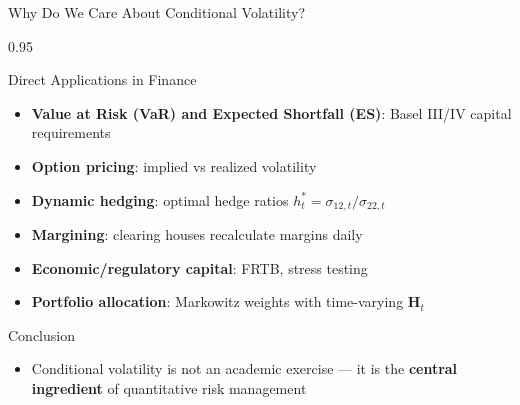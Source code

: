 \documentclass[9pt, aspectratio=169, t]{beamer}
\begin{document}
\begin{frame}{Why Do We Care About Conditional Volatility?}
    \begin{cminipage}{0.95\textwidth}
        \begin{block}{Direct Applications in Finance}
            \begin{itemize}\setlength{\itemsep}{0pt}
                \item \textbf{Value at Risk (VaR) and Expected Shortfall (ES)}: Basel III/IV capital requirements
                \item \textbf{Option pricing}: implied vs realized volatility
                \item \textbf{Dynamic hedging}: optimal hedge ratios $h_t^{*} = \sigma_{12,t}/\sigma_{22,t}$
                \item \textbf{Margining}: clearing houses recalculate margins daily
                \item \textbf{Economic/regulatory capital}: FRTB, stress testing
                \item \textbf{Portfolio allocation}: Markowitz weights with time-varying $\mathbf{H}_t$
            \end{itemize}
        \end{block}
        \vspace{0.2cm}
        \begin{alertblock}{Conclusion}
            \begin{itemize}\setlength{\itemsep}{0pt}
                \item Conditional volatility is not an academic exercise --- it is the \textbf{central ingredient} of quantitative risk management
            \end{itemize}
        \end{alertblock}
    \end{cminipage}
\end{frame}
\end{document}
